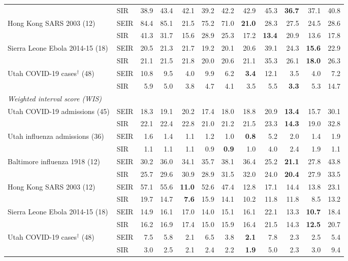 \begin{tabular}{llrrrrrrrrrr}
 & SIR & 38.9 & 43.4 & 42.1 & 39.2 & 42.2 & 42.9 & 45.3 & \textbf{36.7} & 37.1 & 40.8 \\
Hong Kong SARS 2003 (12) & SEIR & 84.4 & 85.1 & 21.5 & 75.2 & 71.0 & \textbf{21.0} & 28.3 & 27.5 & 24.5 & 28.6 \\
 & SIR & 41.3 & 31.7 & 15.6 & 28.9 & 25.3 & 17.2 & \textbf{13.4} & 20.9 & 13.6 & 17.8 \\
Sierra Leone Ebola 2014-15 (18) & SEIR & 20.5 & 21.3 & 21.7 & 19.2 & 20.1 & 20.6 & 39.1 & 24.3 & \textbf{15.6} & 22.9 \\
 & SIR & 21.1 & 21.5 & 21.8 & 20.0 & 20.6 & 21.1 & 35.3 & 26.1 & \textbf{18.0} & 26.3 \\
Utah COVID-19 cases$^\dagger$ (48) & SEIR & 10.8 & 9.5 & 4.0 & 9.9 & 6.2 & \textbf{3.4} & 12.1 & 3.5 & 4.0 & 7.2 \\
 & SIR & 5.9 & 5.0 & 3.8 & 4.7 & 4.1 & 3.5 & 5.5 & \textbf{3.3} & 5.3 & 14.7 \\
\midrule
\multicolumn{12}{l}{\textit{Weighted interval score (WIS)}} \\
Utah COVID-19 admissions (45) & SEIR & 18.3 & 19.1 & 20.2 & 17.4 & 18.0 & 18.8 & 20.9 & \textbf{13.4} & 15.7 & 30.1 \\
 & SIR & 22.1 & 22.4 & 22.8 & 21.0 & 21.2 & 21.5 & 23.3 & \textbf{14.3} & 19.0 & 32.8 \\
Utah influenza admissions (36) & SEIR & 1.6 & 1.4 & 1.1 & 1.2 & 1.0 & \textbf{0.8} & 5.2 & 2.0 & 1.4 & 1.9 \\
 & SIR & 1.1 & 1.1 & 1.1 & 0.9 & \textbf{0.9} & 1.0 & 4.0 & 2.4 & 1.9 & 1.1 \\
Baltimore influenza 1918 (12) & SEIR & 30.2 & 36.0 & 34.1 & 35.7 & 38.1 & 36.4 & 25.2 & \textbf{21.1} & 27.8 & 43.8 \\
 & SIR & 25.7 & 29.6 & 30.9 & 28.9 & 31.5 & 32.0 & 24.0 & \textbf{20.4} & 27.9 & 33.5 \\
Hong Kong SARS 2003 (12) & SEIR & 57.1 & 55.6 & \textbf{11.0} & 52.6 & 47.4 & 12.8 & 17.1 & 14.4 & 13.8 & 23.1 \\
 & SIR & 19.7 & 14.7 & \textbf{7.6} & 15.9 & 14.1 & 10.2 & 11.8 & 11.8 & 8.5 & 13.2 \\
Sierra Leone Ebola 2014-15 (18) & SEIR & 14.9 & 16.1 & 17.0 & 14.0 & 15.1 & 16.1 & 22.1 & 13.3 & \textbf{10.7} & 18.4 \\
 & SIR & 16.2 & 16.9 & 17.4 & 15.0 & 15.9 & 16.4 & 21.5 & 14.3 & \textbf{12.5} & 20.7 \\
Utah COVID-19 cases$^\dagger$ (48) & SEIR & 7.5 & 5.8 & 2.1 & 6.5 & 3.8 & \textbf{2.1} & 7.8 & 2.3 & 2.5 & 5.4 \\
 & SIR & 3.0 & 2.5 & 2.1 & 2.4 & 2.2 & \textbf{1.9} & 5.0 & 2.3 & 3.0 & 9.4 \\
\bottomrule
\end{tabular}
